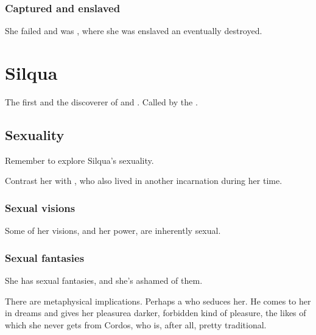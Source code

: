 \subsubsection{Captured and enslaved}
She failed and was , where she was enslaved an eventually destroyed. 

















\section{Silqua}
The first  and the discoverer of  and . 
Called  by the . 







\subsection{Sexuality}
Remember to explore Silqua's sexuality. 

Contrast her with \Belzir, who also lived in another incarnation during her time.





\subsubsection{Sexual visions}
Some of her visions, and her \malach{} power, are inherently sexual. 





\subsubsection{Sexual fantasies}
She has sexual fantasies, and she's ashamed of them. 

There are metaphysical implications. Perhaps a \resphan{} who seduces her. He comes to her in dreams and gives her pleasure\dash a darker, forbidden kind of pleasure, the likes of which she never gets from Cordos, who is, after all, pretty traditional. 

